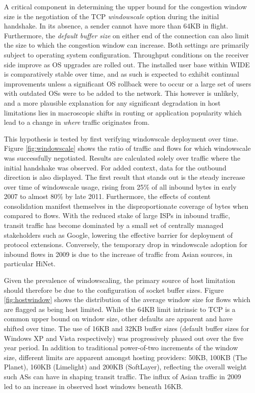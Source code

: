 A critical component in determining the upper bound for the congestion window size is the negotiation of the \ac{TCP} \emph{windowscale} option during the initial handshake. 
In its absence, a sender cannot have more than 64KB in flight.
Furthermore, the \emph{default buffer size} on either end of the connection can also limit the size to which the congestion window can increase.
Both settings are primarily subject to operating system configuration.
Throughput conditions on the receiver side improve as \acs{OS} upgrades are rolled out.
The installed user base within \acs{WIDE} is comparatively stable over time, and as such is expected to exhibit continual improvements unless a significant \acs{OS} rollback were to occur or a large set of users with outdated \acp{OS} were to be added to the network.
This however is unlikely, and a more plausible explanation for any significant degradation in host limitations lies in macroscopic shifts in routing or application popularity which lead to a change in \emph{where} traffic originates from.

This hypothesis is tested by first verifying windowscale deployment over time.
Figure \ref{fig:windowscale} shows the ratio of traffic and flows for which windowscale was successfully negotiated.
Results are calculated solely over traffic where the initial handshake was observed.
For added context, data for the outbound direction is also displayed.
The first result that stands out is the steady increase over time of windowscale usage, rising from 25\% of all inbound bytes in early 2007 to almost 80\% by late 2011.
Furthermore, the effects of content consolidation manifest themselves in the disproportionate coverage of bytes when compared to flows.
With the reduced stake of large \acp{ISP} in inbound traffic, transit traffic has become dominated by a small set of centrally managed stakeholders such as Google, lowering the effective barrier for deployment of protocol extensions.
Conversely, the temporary drop in windowscale adoption for inbound flows in 2009 is due to the increase of traffic from Asian sources, in particular HiNet.

Given the prevalence of windowscaling, the primary source of host limitation should therefore be due to the configuration of socket buffer sizes.
Figure \ref{fig:hostwindow} shows the distribution of the average window size for flows which are flagged as being host limited.
While the 64KB limit intrinsic to \ac{TCP} is a common upper bound on window size, other defaults are apparent and have shifted over time.
The use of 16KB and 32KB buffer sizes (default buffer sizes for Windows XP and Vista respectively) was progressively phased out over the five year period.
In addition to traditional power-of-two increments of the window size, different limits are apparent amongst hosting providers: 50KB, 100KB (The Planet), 160KB (Limelight) and 200KB (SoftLayer), reflecting the overall weight such \acp{AS} can have in shaping transit traffic.
The influx of Asian traffic in 2009 led to an increase in observed host windows beneath 16KB.

